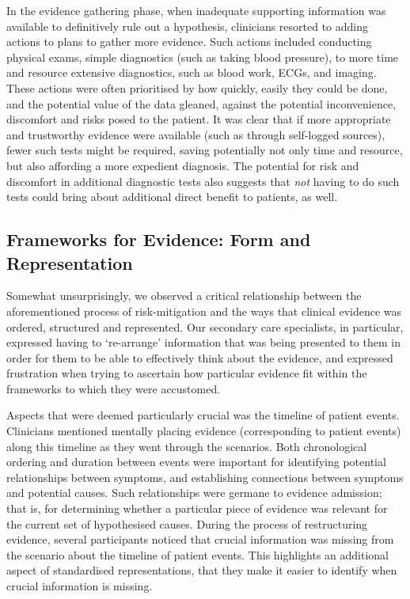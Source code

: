 \documentclass{sigchi}
\begin{document}
In the evidence gathering phase, when inadequate supporting information was available to definitively rule out a hypothesis, clinicians resorted to adding actions to plans to gather more evidence.  Such actions included conducting physical exams, simple diagnostics (such as taking blood pressure), to more time and resource extensive diagnostics, such as blood work, ECGs, and imaging.  These actions were often prioritised by how quickly, easily they could be done, and the potential value of the data gleaned, against the potential inconvenience, discomfort and risks posed to the patient.  It was clear that if more appropriate and trustworthy evidence were available (such as through self-logged sources), fewer such tests might be required, saving potentially not only time and resource, but also affording a more expedient diagnosis.  The potential for risk and discomfort in additional diagnostic tests also suggests that \emph{not} having to do such tests could bring about additional direct benefit to patients, as well. 

\subsection{Frameworks for Evidence: Form and Representation}

Somewhat unsurprisingly, we observed a critical relationship between the aforementioned process of risk-mitigation and the ways that clinical evidence was ordered, structured and represented. Our  secondary care specialists, in particular, expressed having to `re-arrange' information that was being presented to them in order for them to be able to effectively think about the evidence, and expressed frustration when trying to ascertain how particular evidence fit within the frameworks to which they were accustomed.

Aspects that were deemed particularly crucial was the timeline of patient events.  Clinicians mentioned mentally placing evidence (corresponding to patient events) along this timeline as they went through the scenarios. Both chronological ordering and duration between events were important for identifying potential relationships between symptoms, and establishing connections between symptoms and potential causes.   Such relationships were germane to evidence admission; that is, for determining whether a particular piece of evidence was relevant for the current set of hypothesised causes. During the process of restructuring evidence, several participants noticed that crucial information was missing from the scenario about the timeline of patient events.  This highlights an additional aspect of standardised representations, that they make it easier to identify when crucial information is missing.
\end{document}
